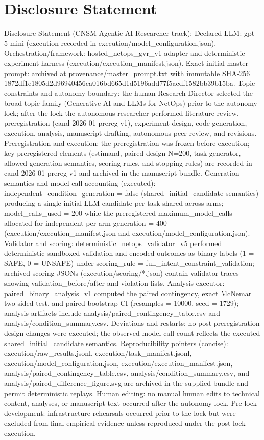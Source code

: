 \documentclass[conference]{IEEEtran}
\begin{document}
\section*{Disclosure Statement}
Disclosure Statement (CNSM Agentic AI Researcher track): Declared LLM: gpt-5-mini (execution recorded in execution/model\_configuration.json). Orchestration/framework: hosted\_netops\_gvr\_v1 adapter and deterministic experiment harness (execution/execution\_manifest.json). Exact initial master prompt: archived at provenance/master\_prompt.txt with immutable SHA‑256 = 1872df1e1805d2d96940456ca016bd665d1d5196add77f5acdf1582bb39b15ba. Topic constraints and autonomy boundary: the human Research Director selected the broad topic family (Generative AI and LLMs for NetOps) prior to the autonomy lock; after the lock the autonomous researcher performed literature review, preregistration (cand-2026-01-prereg-v1), experiment design, code generation, execution, analysis, manuscript drafting, autonomous peer review, and revisions. Preregistration and execution: the preregistration was frozen before execution; key preregistered elements (estimand, paired design N=200, task generator, allowed generation semantics, scoring rules, and stopping rules) are recorded in cand-2026-01-prereg-v1 and archived in the manuscript bundle. Generation semantics and model‑call accounting (executed): independent\_condition\_generation = false (shared\_initial\_candidate semantics) producing a single initial LLM candidate per task shared across arms; model\_calls\_used = 200 while the preregistered maximum\_model\_calls allocated for independent per‑arm generation = 400 (execution/execution\_manifest.json and execution/model\_configuration.json). Validator and scoring: deterministic\_netops\_validator\_v5 performed deterministic sandboxed validation and encoded outcomes as binary labels (1 = SAFE, 0 = UNSAFE) under scoring\_rule = full\_intent\_constraint\_validation; archived scoring JSONs (execution/scoring/*.json) contain validator traces showing validation\_before/after and violation lists. Analysis executor: paired\_binary\_analysis\_v1 computed the paired contingency, exact McNemar two‑sided test, and paired bootstrap CI (resamples = 10000, seed = 1729); analysis artifacts include analysis/paired\_contingency\_table.csv and analysis/condition\_summary.csv. Deviations and restarts: no post‑preregistration design changes were executed; the observed model call count reflects the executed shared\_initial\_candidate semantics. Reproducibility pointers (concise): execution/raw\_results.jsonl, execution/task\_manifest.jsonl, execution/model\_configuration.json, execution/execution\_manifest.json, analysis/paired\_contingency\_table.csv, analysis/condition\_summary.csv, and analysis/paired\_difference\_figure.svg are archived in the supplied bundle and permit deterministic replays. Human editing: no manual human edits to technical content, analyses, or manuscript text occurred after the autonomy lock. Pre‑lock development: infrastructure rehearsals occurred prior to the lock but were excluded from final empirical evidence unless reproduced under the post‑lock execution.
\end{document}
